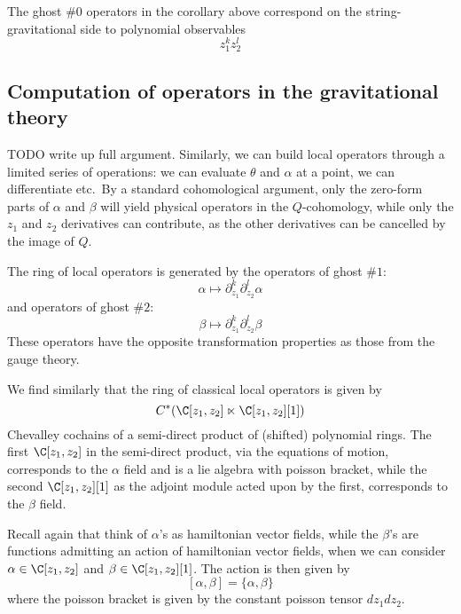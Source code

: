\documentclass[12pt]{amsart}
\begin{document}
\begin{rmk}
  The ghost \#$0$ operators in the corollary above correspond on the string-gravitational side to polynomial observables
  $$z_1^kz_2^l$$
\end{rmk}

\subsection{Computation of operators in the gravitational theory}
TODO write up full argument.
Similarly, we can build local operators through a limited series of operations:
we can evaluate $\theta$ and $\alpha$ at a point, we can differentiate etc.\ By
a standard cohomological argument, only the zero-form parts of $\alpha$ and
$\beta$ will yield physical operators in the $Q$-cohomology, while only the
$z_1$ and $z_2$ derivatives can contribute, as the other derivatives can be
cancelled by the image of $Q$.\par

The ring of local operators is generated by the operators of ghost \#$1$: $$\alpha \mapsto
\partial_{z_1}^k \partial_{z_2}^l \alpha$$
and operators of ghost \#$2$:
$$\beta \mapsto \partial_{z_1}^k \partial_{z_2}^l \beta$$
These operators have the opposite transformation properties as those from the
gauge theory.\par

We find similarly that the ring of classical local operators is given by
$$C^*(\C[z_1,z_2] \ltimes \C[z_1,z_2][1])$$
Chevalley cochains of a semi-direct product of (shifted) polynomial rings. The
first $\C[z_1,z_2]$ in the semi-direct product, via the equations of motion,
corresponds to the $\alpha$ field and is a lie algebra with poisson bracket,
while the second $\C[z_1,z_2][1]$ as the adjoint module acted upon by the
first, corresponds to the $\beta$ field.

\begin{rmk}
  Recall again that think of $\alpha$'s as
  hamiltonian vector fields, while the $\beta$'s are functions admitting an action
  of hamiltonian vector fields, when  we can consider $\alpha \in \C[z_1,z_2]$ and $\beta \in
  \C[z_1,z_2][1]$.
  The action is then given by
  $$[\alpha, \beta] = \{\alpha,\beta\}$$ where the poisson bracket is given by
  the constant poisson tensor $dz_1dz_2$.
\end{rmk}
\end{document}
